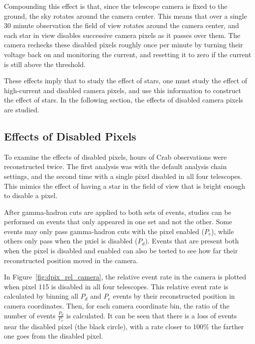     Compounding this effect is that, since the telescope camera is fixed to the ground, the sky rotates around the camera center.
    This means that over a single 30 minute observation the field of view rotates around the camera center, and each star in view disables successive camera pixels as it passes over them.
    The camera rechecks these disabled pixels roughly once per minute by turning their voltage back on and monitoring the current, and resetting it to zero if the current is still above the threshold.

    These effects imply that to study the effect of stars, one must study the effect of high-current and disabled camera pixels, and use this information to construct the effect of stars.
    In the following section, the effects of disabled camera pixels are studied.
    
  \subsection{Effects of Disabled Pixels}

    To examine the effects of disabled pixels,  hours of Crab observations were reconstructed twice.
    The first analysis was with the default analysis chain settings, and the second time with a single pixel disabled in all four telescopes.
    This mimics the effect of having a star in the field of view that is bright enough to disable a pixel.

    After gamma-hadron cuts are applied to both sets of events, studies can be performed on events that only appeared in one set and not the other.
    Some events may only pass gamma-hadron cuts with the pixel enabled ($P_e$), while others only pass when the pxiel is disabled ($P_d$).
    Events that are present both when the pixel is disabled and enabled can also be tested to see how far their reconstructed position moved in the camera.

    In Figure~\ref{fig:dpix_rel_camera}, the relative event rate in the camera is plotted when pixel 115 is disabled in all four telescopes.
    This relative event rate is calculated by binning all $P_d$ and $P_e$ events by their reconstructed position in camera coordinates.
    Then, for each camera coordinate bin, the ratio of the number of events $\frac{P_d}{P_e}$ is calculated.
    It can be seen that there is a loss of events near the disabled pixel (the black circle), with a rate closer to 100\% the farther one goes from the disabled pixel.


